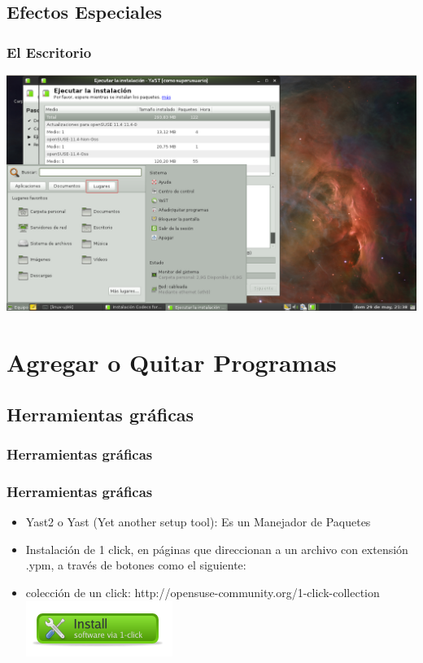 \documentclass{beamer}
\begin{document}
\subsection{Efectos Especiales}
\begin{frame}
\frametitle{El Escritorio}
\includegraphics[height=0.8\textheight]{desktop4.png} \hspace*{7.3cm}
\end{frame} 

\section{Agregar o Quitar Programas}
\subsection{Herramientas gr\'aficas}
\begin{frame}
\tableofcontents[currentsection]
\frametitle{Herramientas gr\'aficas}
\end{frame} 

\begin{frame}
\frametitle{Herramientas gr\'aficas}
\begin{itemize}
\item Yast2 o Yast (Yet another setup tool): Es un Manejador de Paquetes
\item Instalaci\'on de 1 click, en p\'aginas que direccionan a un archivo con extensi\'on .ypm, a través de botones como el siguiente:
\item colecci\'on de un click:  http://opensuse-community.org/1-click-collection
\includegraphics[height=0.1\textheight]{boton.png} \hspace*{7.3cm}
\end{itemize}
\end{frame} 
\end{document}
